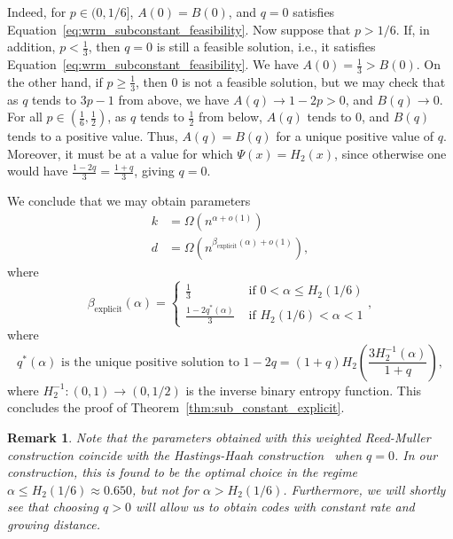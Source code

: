 \documentclass{article}
\newcounter{main}[section]
\newtheorem{remark}[main]{Remark}
\begin{document}
Indeed, for $p \in (0,1/6]$, $A(0) = B(0)$, and $q=0$ satisfies Equation~\eqref{eq:wrm_subconstant_feasibility}. Now suppose that $p > 1/6$. If, in addition, $p < \frac{1}{3}$, then $q=0$ is still a feasible solution, i.e., it satisfies Equation~\eqref{eq:wrm_subconstant_feasibility}. We have $A(0) = \frac{1}{3} > B(0)$. On the other hand, if $p \geq \frac{1}{3}$, then $0$ is not a feasible solution, but we may check that as $q$ tends to $3p-1$ from above, we have $A(q) \to 1-2p > 0$, and $B(q) \to 0$. For all $p \in (\frac{1}{6},\frac{1}{2})$, as $q$ tends to $\frac{1}{2}$ from below, $A(q)$ tends to $0$, and $B(q)$ tends to a positive value. Thus, $A(q) = B(q)$ for a unique positive value of $q$. Moreover, it must be at a value for which $\Psi(x) = H_2(x)$, since otherwise one would have $\frac{1-2q}{3} = \frac{1+q}{3}$, giving $q = 0$.

We conclude that we may obtain parameters
\begin{align}
    k &= \Omega\left(n^{\alpha + o(1)}\right)\\
    d &= \Omega\left(n^{\beta_{\text{explicit}}(\alpha)+o(1)}\right),
\end{align}
where
\begin{equation}
    \beta_{\text{explicit}}(\alpha) = \begin{cases}
        \frac{1}{3} &\text{ if } 0 < \alpha \leq H_2(1/6)\\
        \frac{1-2q^*(\alpha)}{3} &\text{ if } H_2(1/6) < \alpha < 1
    \end{cases},
\end{equation}
where
\begin{equation}
    q^*(\alpha)\text{ is the unique positive solution to }1-2q = (1+q)H_2\left(\frac{3H_2^{-1}(\alpha)}{1+q}\right),
\end{equation}
where $H_2^{-1}:(0,1) \to (0,1/2)$ is the inverse binary entropy function. This concludes the proof of Theorem~\ref{thm:sub_constant_explicit}.
\begin{remark}
    Note that the parameters obtained with this weighted Reed-Muller construction coincide with the Hastings-Haah construction~\cite{hastings2018distillation} when $q=0$. In our construction, this is found to be the optimal choice in the regime $\alpha \leq H_2(1/6) \approx 0.650$, but not for $\alpha > H_2(1/6)$. Furthermore, we will shortly see that choosing $q>0$ will allow us to obtain codes with constant rate and growing distance.
\end{remark}
\end{document}
